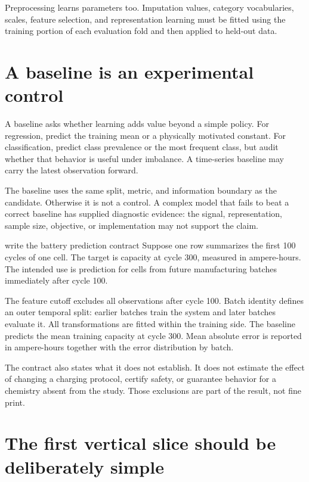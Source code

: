 \begin{warningbox}
Preprocessing learns parameters too. Imputation values, category vocabularies,
scales, feature selection, and representation learning must be fitted using the
training portion of each evaluation fold and then applied to held-out data.
\end{warningbox}

\section{A baseline is an experimental control}

A baseline asks whether learning adds value beyond a simple policy. For
regression, predict the training mean or a physically motivated constant. For
classification, predict class prevalence or the most frequent class, but audit
whether that behavior is useful under imbalance. A time-series baseline may
carry the latest observation forward.

The baseline uses the same split, metric, and information boundary as the
candidate. Otherwise it is not a control. A complex model that fails to beat a
correct baseline has supplied diagnostic evidence: the signal, representation,
sample size, objective, or implementation may not support the claim.

\begin{workedexample}{write the battery prediction contract}
Suppose one row summarizes the first 100 cycles of one cell. The target is
capacity at cycle 300, measured in ampere-hours. The intended use is prediction
for cells from future manufacturing batches immediately after cycle 100.

The feature cutoff excludes all observations after cycle 100. Batch identity
defines an outer temporal split: earlier batches train the system and later
batches evaluate it. All transformations are fitted within the training side.
The baseline predicts the mean training capacity at cycle 300. Mean absolute
error is reported in ampere-hours together with the error distribution by batch.

The contract also states what it does not establish. It does not estimate the
effect of changing a charging protocol, certify safety, or guarantee behavior
for a chemistry absent from the study. Those exclusions are part of the result,
not fine print.
\end{workedexample}

\section{The first vertical slice should be deliberately simple}

